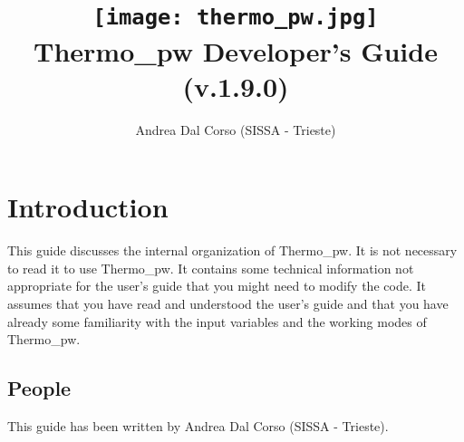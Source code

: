 \documentclass[12pt,a4paper,twoside]{report}
\def\version{1.9.0}
\def\tpw{{\sc Thermo}\_{\sc pw}}
\begin{document}
 

\author{Andrea Dal Corso (SISSA - Trieste)}
\date{}

\title{
  \texttt{[image: thermo\_pw.jpg]} \\
  \vspace{3truecm}
  \Huge \color{dark-blue} {\sc Thermo}\_{\sc pw} Developer's Guide \\
  (v.\version)
}

\maketitle

\newpage

\tableofcontents

\newpage

{\color{dark-blue}\chapter{Introduction}}
\color{black}
This guide discusses the internal organization of \tpw. It is not necessary
to read it to use \tpw. It contains some technical information not 
appropriate for the user's guide that you might need to modify the code.
It assumes that you have read and understood the user's guide and that
you have already some familiarity with the input variables and 
the working modes of \tpw.

{\color{coral}\section{People}}
\color{black}
This guide has been written by Andrea Dal Corso (SISSA - Trieste). 
\end{document}
